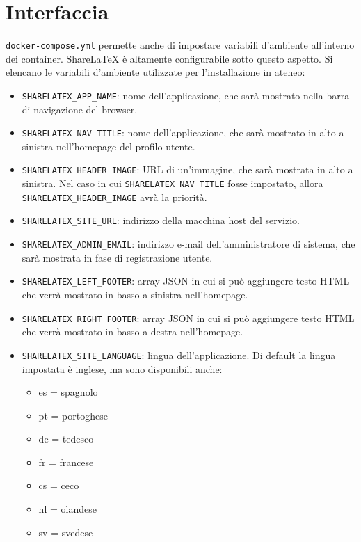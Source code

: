 \section{Interfaccia}
\verb|docker-compose.yml| permette anche di impostare variabili d'ambiente all'interno dei container. ShareLaTeX è altamente configurabile sotto questo aspetto. Si elencano le variabili d'ambiente utilizzate per l'installazione in ateneo:
\begin{itemize}
    \item \verb|SHARELATEX_APP_NAME|: nome dell'applicazione, che sarà mostrato nella barra di navigazione del browser.
    \item \verb|SHARELATEX_NAV_TITLE|: nome dell'applicazione, che sarà mostrato in alto a sinistra nell'homepage del profilo utente.
    \item \verb|SHARELATEX_HEADER_IMAGE|: URL di un'immagine, che sarà mostrata in alto a sinistra. Nel caso in cui \verb|SHARELATEX_NAV_TITLE| fosse impostato, allora\\\verb|SHARELATEX_HEADER_IMAGE| avrà la priorità.
    \item \verb|SHARELATEX_SITE_URL|: indirizzo della macchina host del servizio.
    \item \verb|SHARELATEX_ADMIN_EMAIL|: indirizzo e-mail dell'amministratore di sistema, che sarà mostrata in fase di registrazione utente.
    \item \verb|SHARELATEX_LEFT_FOOTER|: array JSON in cui si può aggiungere testo HTML che verrà mostrato in basso a sinistra nell'homepage.
    \item \verb|SHARELATEX_RIGHT_FOOTER|: array JSON in cui si può aggiungere testo HTML che verrà mostrato in basso a destra nell'homepage.
    \item \verb|SHARELATEX_SITE_LANGUAGE|: lingua dell'applicazione. Di default la lingua impostata è inglese, ma sono disponibili anche:
        \begin{multicols}{3}
            \begin{itemize}
                \item es = spagnolo
                \item pt = portoghese
                \item de = tedesco
                \item fr = francese
                \item cs = ceco
                \item nl = olandese
                \item sv = svedese

\end{itemize}
\end{multicols}
\end{itemize}
